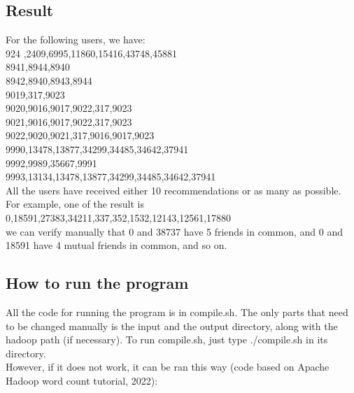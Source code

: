 \documentclass[11pt]{article}
\begin{document}
\begin{justifying}
\subsection{Result}
For the following users, we have:\\
924 \space \space \space {},2409,6995,11860,15416,43748,45881\\
8941\space \space \space {},8944,8940\\
8942\space \space \space {},8940,8943,8944\\
9019\space \space \space {},317,9023\\
9020\space \space \space {},9016,9017,9022,317,9023\\
9021\space \space \space {},9016,9017,9022,317,9023\\
9022\space \space \space {},9020,9021,317,9016,9017,9023\\
9990\space \space \space {},13478,13877,34299,34485,34642,37941\\
9992\space \space \space {},9989,35667,9991\\
9993\space \space \space {},13134,13478,13877,34299,34485,34642,37941\\
All the users have received either 10 recommendations or as many as possible. For example, one of the result is\\
0\space \space \space {},18591,27383,34211,337,352,1532,12143,12561,17880\\
we can verify manually that 0 and 38737 have 5 friends in common, and 0 and 18591 have
4 mutual friends in common, and so on.

\subsection{How to run the program}
All the code for running the program is in compile.sh. The only parts that need to be changed
manually is the input and the output directory, along with the hadoop path (if necessary). To
run compile.sh, just type ./compile.sh in its directory.\\
However, if it does not work, it can be ran this way (code based on Apache Hadoop word count tutorial, 2022):



\end{justifying}
\end{document}
